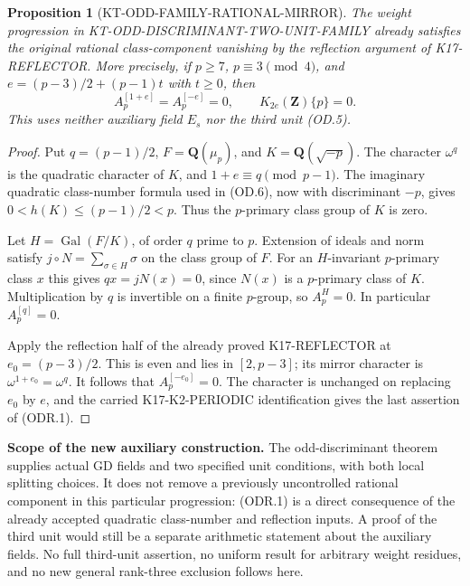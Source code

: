 \documentclass[11pt,a4paper]{article}
\newtheorem{proposition}[theorem]{Proposition}
\theoremstyle{definition}
\renewcommand{\paragraph}[1]{\par\smallskip\noindent\textbf{#1}\quad\ignorespaces}
\begin{document}
\begin{proposition}[KT-ODD-FAMILY-RATIONAL-MIRROR]
The weight progression in KT-ODD-DISCRIMINANT-TWO-UNIT-FAMILY
already satisfies the original rational class-component vanishing
by the reflection argument of K17-REFLECTOR.  More precisely, if
$p\geq7$, $p\equiv3\pmod4$, and
$e=(p-3)/2+(p-1)t$ with $t\geq0$, then
\[
 A_p^{[1+e]}=A_p^{[-e]}=0,
 \qquad K_{2e}(\mathbf Z)\{p\}=0.                     \tag{ODR.1}
\]
This uses neither auxiliary field $E_s$ nor the third unit (OD.5).
\end{proposition}
\begin{proof}
Put $q=(p-1)/2$, $F=\mathbf Q(\mu_p)$, and
$K=\mathbf Q(\sqrt{-p})$.  The character $\omega^q$ is the
quadratic character of $K$, and $1+e\equiv q\pmod{p-1}$.
The imaginary quadratic class-number formula used in (OD.6), now
with discriminant $-p$, gives $0<h(K)\leq(p-1)/2<p$.
Thus the $p$-primary class group of $K$ is zero.

Let $H=\operatorname{Gal}(F/K)$, of order $q$ prime to $p$.
Extension of ideals and norm satisfy
$j\circ N=\sum_{\sigma\in H}\sigma$ on the class group of $F$.
For an $H$-invariant $p$-primary class $x$ this gives
$q x=jN(x)=0$, since $N(x)$ is a $p$-primary class of $K$.
Multiplication by $q$ is invertible on a finite $p$-group, so
$A_p^H=0$.  In particular $A_p^{[q]}=0$.

Apply the reflection half of the already proved K17-REFLECTOR
at $e_0=(p-3)/2$.  This is even and lies in $[2,p-3]$;
its mirror character is $\omega^{1+e_0}=\omega^q$.
It follows that $A_p^{[-e_0]}=0$.  The character is unchanged
on replacing $e_0$ by $e$, and the carried K17-K2-PERIODIC
identification gives the last assertion of (ODR.1).
\end{proof}

\paragraph{Scope of the new auxiliary construction.}
The odd-discriminant theorem supplies actual GD fields and two
specified unit conditions, with both local splitting choices.
It does not remove a previously uncontrolled rational component
in this particular progression: (ODR.1) is a direct consequence
of the already accepted quadratic class-number and reflection
inputs.  A proof of the third unit would still be a separate
arithmetic statement about the auxiliary fields.  No full
third-unit assertion, no uniform result for arbitrary weight
residues, and no new general rank-three exclusion follows here.
\end{document}

